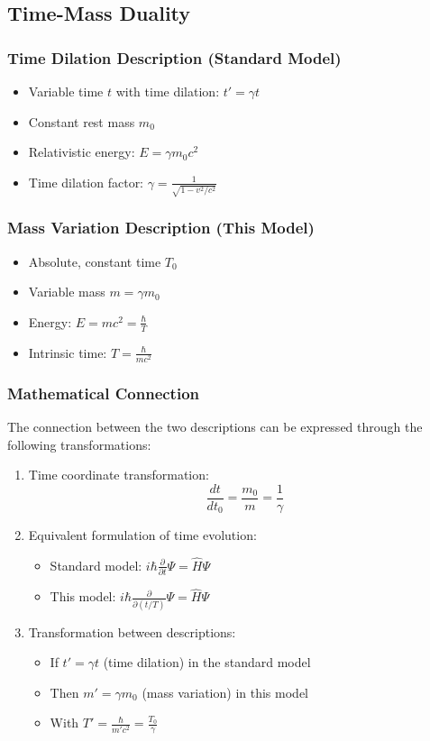 \documentclass[a4paper,12pt]{article}
\begin{document}
	\subsection{Time-Mass Duality}
	
	\subsubsection{Time Dilation Description (Standard Model)}
	\begin{itemize}
		\item Variable time \( t \) with time dilation: \( t' = \gamma t \)
		\item Constant rest mass \( m_0 \)
		\item Relativistic energy: \( E = \gamma m_0c^2 \)
		\item Time dilation factor: \( \gamma = \frac{1}{\sqrt{1-v^2/c^2}} \)
	\end{itemize}
	
	\subsubsection{Mass Variation Description (This Model)}
	\begin{itemize}
		\item Absolute, constant time \( T_0 \)
		\item Variable mass \( m = \gamma m_0 \)
		\item Energy: \( E = mc^2 = \frac{\hbar}{T} \)
		\item Intrinsic time: \( T = \frac{\hbar}{mc^2} \)
	\end{itemize}
	
	\subsubsection{Mathematical Connection}
	The connection between the two descriptions can be expressed through the following transformations:
	\begin{enumerate}
		\item Time coordinate transformation:
		\[
		\frac{dt}{dt_0} = \frac{m_0}{m} = \frac{1}{\gamma}
		\]
		\item Equivalent formulation of time evolution:
		\begin{itemize}
			\item Standard model: \( i\hbar\frac{\partial}{\partial t}\Psi = \hat{H}\Psi \)
			\item This model: \( i\hbar\frac{\partial}{\partial (t/T)}\Psi = \hat{H}\Psi \)
		\end{itemize}
		\item Transformation between descriptions:
		\begin{itemize}
			\item If \( t' = \gamma t \) (time dilation) in the standard model
			\item Then \( m' = \gamma m_0 \) (mass variation) in this model
			\item With \( T' = \frac{\hbar}{m'c^2} = \frac{T_0}{\gamma} \)
		\end{itemize}
	\end{enumerate}
	
\end{document}
